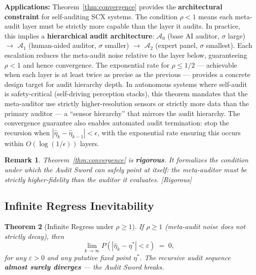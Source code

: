 \documentclass[12pt,a4paper]{article}
\newtheorem{theorem}{Theorem}[section]
\newtheorem{remark}[theorem]{Remark}
\newcommand{\rigorous}{\textcolor{green!50!black}{\small\textsf{[Rigorous]}}}
\newcommand{\cA}{\mathcal{A}}
\begin{document}
\medskip\noindent
\textbf{Applications:}
Theorem~\ref{thm:convergence} provides the \textbf{architectural constraint}
for self-auditing SCX systems.  The condition $\rho<1$ means each meta-audit
layer must be strictly more capable than the layer it audits.  In practice,
this implies a \textbf{hierarchical audit architecture}: $\cA_0$ (base AI
auditor, $\sigma$ large) $\to$ $\cA_1$ (human-aided auditor, $\sigma$ smaller)
$\to$ $\cA_2$ (expert panel, $\sigma$ smallest).  Each escalation reduces the
meta-audit noise relative to the layer below, guaranteeing $\rho<1$ and hence
convergence.  The exponential rate for $\rho\leq1/2$ — achievable when each
layer is at least twice as precise as the previous — provides a concrete
design target for audit hierarchy depth.  In autonomous systems where
self-audit is safety-critical (self-driving perception stacks), this theorem
mandates that the meta-auditor use strictly higher-resolution sensors or
strictly more data than the primary auditor — a ``sensor hierarchy'' that
mirrors the audit hierarchy.  The convergence guarantee also enables automated
audit termination: stop the recursion when
$|\hat{\eta}_k-\hat{\eta}_{k-1}|<\epsilon$, with the exponential rate
ensuring this occurs within $O(\log(1/\epsilon))$ layers.

\begin{remark}
Theorem~\ref{thm:convergence} is \textbf{rigorous}.  It formalizes the
condition under which the Audit Sword can safely point at itself: the
meta-auditor must be \emph{strictly higher-fidelity} than the auditor it
evaluates.  \rigorous
\end{remark}

\subsection{Infinite Regress Inevitability}

\begin{theorem}[Infinite Regress under $\rho\geq1$]
\label{thm:divergence}
If $\rho\geq1$ (meta-audit noise does not strictly decay), then
\begin{equation}\label{eq:divergence-prob}
    \lim_{k\to\infty} P(|\hat{\eta}_k-\eta^*| < \varepsilon) \;=\; 0,
\end{equation}
for any $\varepsilon>0$ and any putative fixed point $\eta^*$.  The recursive
audit sequence \textbf{almost surely diverges} — the Audit Sword breaks.
\end{theorem}
\end{document}

